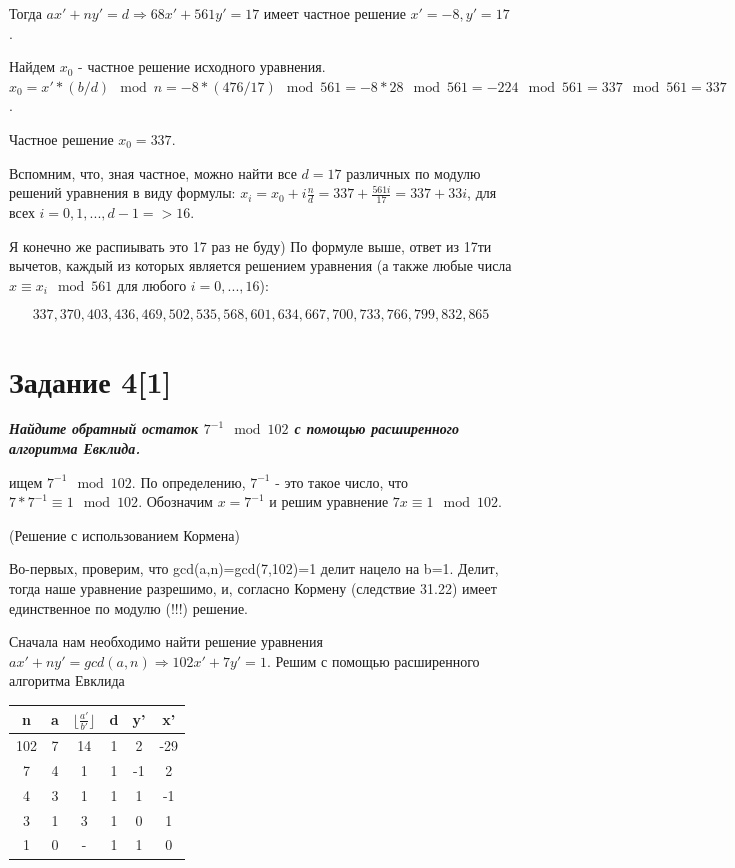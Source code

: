 \documentclass{article}
\begin{document}
Тогда $ax' + ny' = d \Rightarrow 68x' + 561y' = 17$ имеет частное решение $x' = -8, y' = 17$. 

Найдем $x_0$ - частное решение исходного уравнения. $x_0 = x'*(b/d) \mod n = -8 * (476/17) \mod 561 = -8*28 \mod 561 = -224 \mod 561 = 337 \mod 561 = 337$.

Частное решение $x_0 = 337$.

Вспомним, что, зная частное, можно найти все $d = 17$ различных по модулю решений уравнения в виду формулы:
$x_i = x_0 + i\frac{n}{d} = 337 + \frac{561i}{17} = 337 + 33i$, для всех $i = 0, 1, ..., d-1=>16$. 

Я конечно же распиывать это 17 раз не буду) По формуле выше, ответ из 17ти вычетов, каждый из которых является решением уравнения (а также любые числа $x \equiv x_i \mod 561$ для любого $i = 0, ..., 16$):

$$337, 370, 403, 436, 469, 502, 535, 568, 601, 634, 667, 700, 733, 766, 799, 832, 865$$


\bigskip


\section*{\textbf{Задание 4[1]}} \textbf{\textit{Найдите обратный остаток $7^{-1} \mod 102$ с помощью расширенного алгоритма Евклида.}}

ищем $7^{-1} \mod 102$. По определению,  $7^{-1}$ - это такое число, что $7 * 7^{-1} \equiv 1 \mod 102$. Обозначим 
$x = 7^{-1}$ и решим уравнение $7x \equiv 1 \mod 102$.

(Решение с использованием Кормена)

Во-первых, проверим, что gcd(a,n)=gcd(7,102)=1 делит нацело на b=1. Делит, тогда наше уравнение разрешимо, и, согласно Кормену (следствие 31.22) имеет единственное по модулю (!!!) решение. 

Сначала нам необходимо найти решение уравнения $ax' + ny' = gcd(a,n) \Rightarrow 102x' + 7y' = 1$. Решим с помощью расширенного алгоритма Евклида

\begin{center}
\begin{tabular}{ |c|c|c|c|c|c| } 
\hline
n & a & $\lfloor \frac{a'}{b'} \rfloor$ & d &y' & x'  \\
\hline
102 & 7 & 14 & 1 & 2 & -29  \\ 
7 & 4 & 1 & 1 & -1 & 2 \\ 
4 & 3 & 1 & 1 & 1 & -1 \\ 
3 & 1 & 3 & 1 & 0 & 1\\ 
1 & 0 & - & 1 & 1 & 0 \\ 
\hline
\end{tabular}
\end{center}
\end{document}
